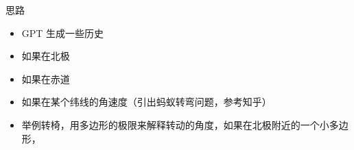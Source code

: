 

\begin{issues}
\issueDraft
\end{issues}

思路
\begin{itemize}
\item GPT 生成一些历史
\item 如果在北极
\item 如果在赤道
\item 如果在某个纬线的角速度（引出蚂蚁转弯问题，参考知乎）
\item 举例转椅，用多边形的极限来解释转动的角度，如果在北极附近的一个小多边形，
\end{itemize}


